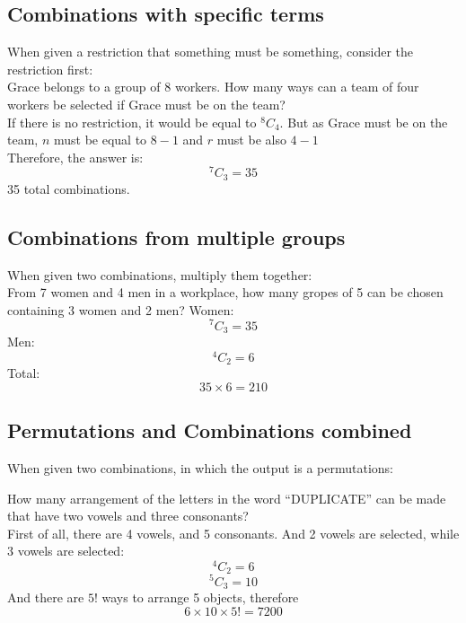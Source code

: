 \documentclass{book}
\newcommand{\Comb}[2]{{}^{#1}C_{#2}}
\begin{document}
\subsection{Combinations with specific terms}
When given a restriction that something must be something, consider the restriction first:\\

Grace belongs to a group of 8 workers.  How many ways can a team of four workers be selected if Grace must be on the team?\\
If there is no restriction, it would be equal to $\Comb{8}{4}$.  But as Grace must be on the team, $n$ must be equal to $8 - 1$ and $r$ must be also $4 - 1$\\
Therefore, the answer is:
\[
	\Comb{7}{3} = 35
\]
35 total combinations.

\subsection{Combinations from multiple groups}
When given two combinations, multiply them together:\\

From 7 women and 4 men in a workplace, how many gropes of 5 can be chosen containing 3 women and 2 men?
Women:
\[
	\Comb{7}{3} = 35
\]
Men:
\[
	\Comb{4}{2} = 6
\]
Total:
\[
	35 \times 6 = 210
\]

\subsection{Permutations and Combinations combined}
When given two combinations, in which the output is a permutations:

How many arrangement of the letters in the word ``DUPLICATE'' can be made that have two vowels and three consonants?\\

First of all, there are 4 vowels, and 5 consonants.  And 2 vowels are selected, while 3 vowels are selected:
\[
	\Comb{4}{2} = 6
\]
\[
	\Comb{5}{3} = 10
\]
And there are $5!$ ways to arrange 5 objects, therefore
\[
	6 \times 10 \times 5! = 7200
\]
\end{document}
